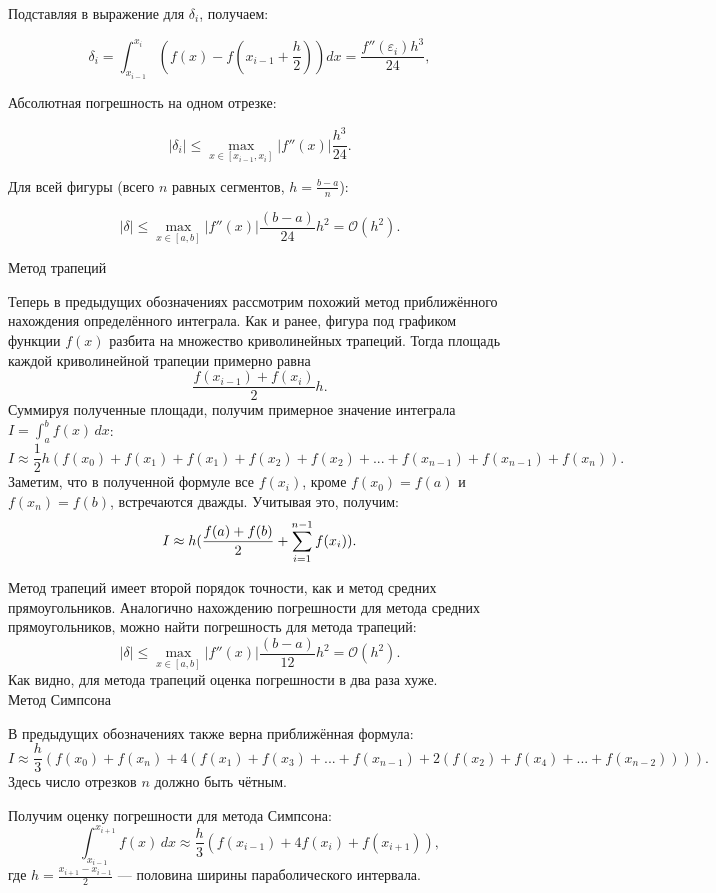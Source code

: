 \documentclass[a4paper, 14pt]{extarticle}
\begin{document}
\begin{justify}
Подставляя в выражение для \( \delta_i \), получаем:

\[
\delta_i = \int_{x_{i-1}}^{x_i} \left(f(x) - f\left(x_{i-1} + \frac{h}{2}\right)\right) dx = \frac{f''(\varepsilon_i) h^3}{24}, 
\]

Абсолютная погрешность на одном отрезке:

\[
|\delta_i| \leq \max_{x \in [x_{i-1}, x_i]} |f''(x)| \frac{h^3}{24}.
\]

Для всей фигуры (всего $n$ равных сегментов, $h = \frac{b-a}{n}$):

\[
|\delta| \leq \max_{x \in [a, b]} |f''(x)| \frac{(b - a)}{24}h^2 = \mathcal{O}(h^2).
\]

\noindent\large {Метод трапеций}\\ \normalsize

Теперь в предыдущих обозначениях рассмотрим похожий метод приближённого нахождения определённого интеграла. Как и ранее,
фигура под графиком функции $f(x)$ разбита на множество криволинейных трапеций.
Тогда площадь каждой криволинейной трапеции примерно равна 
\[
\frac{f(x_{i-1}) + f(x_i)}{2}h. 
\]
Суммируя полученные
площади, получим примерное значение интеграла $I = \int_a^b f(x)\,dx$:
\[ 
I \approx \frac{1}{2}h(f(x_0) + f(x_1) + f(x_1) + 
f(x_2) + f(x_2) + ... + f(x_{n-1}) + f(x_{n-1}) + f(x_n)). 
\]
Заметим, что в полученной формуле все $f(x_i)$,
 кроме $f(x_0) = f(a)$ и $f(x_n) = f(b)$, встречаются дважды. Учитывая это, получим: 
\[
I \approx h(\frac{f(a) + f(b)}{2} + \sum_{i=1}^{n-1} f(x_i)). \\
\]

Метод трапеций имеет второй порядок точности, как и метод средних прямоугольников.
Аналогично нахождению погрешности для метода средних прямоугольников, можно найти погрешность для метода трапеций:
\[
|\delta| \leq \max_{x \in [a, b]} |f''(x)| \frac{(b - a)}{12}h^2 = \mathcal{O}(h^2).
\]
Как видно, для метода трапеций оценка погрешности в два раза хуже. \\

\noindent\large {Метод Симпсона}\\ \normalsize

В предыдущих обозначениях также верна приближённая формула: 
\[
I \approx \frac{h}{3}(f(x_0) + f(x_n) + 4(f(x_1) + f(x_3) + ... + f(x_{n-1}) + 2(f(x_2) + f(x_4) + ... + f(x_{n-2})))).
\]
Здесь число отрезков $n$ должно быть чётным.

Получим оценку погрешности для метода Симпсона: 
\[
\int_{x_{i-1}}^{x_{i+1}} f(x) \, dx \approx \frac{h}{3} \left(f(x_{i-1}) + 4f(x_i) + f(x_{i+1}) \right),
\]
где $h = \frac{x_{i+1} - x_{i-1}}{2}$ — половина ширины параболического интервала.


\end{justify}
\end{document}
